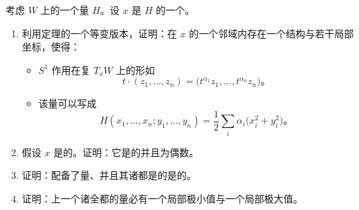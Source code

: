\begin{exercise}[难]\label{ex:ch14-021-isolated-critical-points}
考虑\trCompact{}\trSymplectic\trManifold{} $W$ 上的一个\trPeriodic\trHamiltonian{}量 $H$。设 $x$ 是 $H$ 的一个\trCriticalPoint。

\begin{enumerate}[label=(\arabic*)]
\item 利用\trDarboux{}定理的一个等变版本，证明：在 $x$ 的一个邻域内存在一个\trAlmostComplex{}结构与若干局部坐标，使得：
\begin{itemize}
\item $S^1$ 作用在复\trVectorSpace{} $T_xW$ 上的\trLinearization{}形如
\[
t\cdot(z_1,\dotsc,z_n)=\bigl(t^{\alpha_1}z_1,\dotsc,t^{\alpha_n}z_n\bigr)\text{。}
\]
\item 该\trHamiltonian{}量可以写成
\[
H(x_1,\dotsc,x_n;y_1,\dotsc,y_n)=\frac{1}{2}\sum_i\alpha_i\bigl(x_i^2+y_i^2\bigr)\text{。}
\]
\end{itemize}
\item 假设\trCriticalPoint{} $x$ 是\trIsolated{}的。证明：它是\trNondegenerate{}的并且\trIndex{}为偶数。
\item 证明：配备了\trPeriodic\trHamiltonian{}量、并且其诸\trCriticalPoint{}都是\trIsolated{}的\trConnected\trSymplectic\trManifold{}是\trSimplyConnected{}的。
\item 证明：\trCompact\trConnected\trSymplectic\trManifold{}上一个诸\trCriticalPoint{}全都\trIsolated{}的\trPeriodic\trHamiltonian{}量必有一个局部极小值与一个局部极大值。
\end{enumerate}
\end{exercise}

